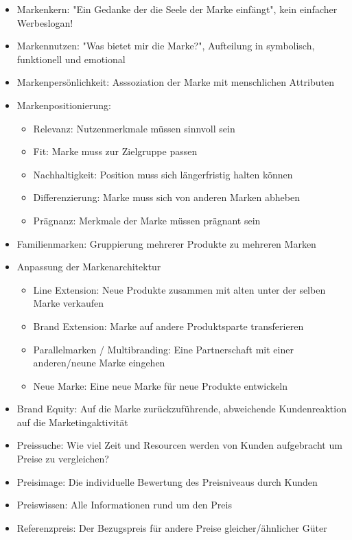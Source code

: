 \documentclass[]{article}
\begin{document}
\begin{itemize}
    \item Markenkern: "Ein Gedanke der die Seele der Marke einfängt", kein einfacher Werbeslogan!
    \item Markennutzen: "Was bietet mir die Marke?", Aufteilung in symbolisch, funktionell und emotional
    \item Markenpersönlichkeit: Asssoziation der Marke mit menschlichen Attributen
    \item Markenpositionierung: 
        \begin{itemize}
            \item Relevanz: Nutzenmerkmale müssen sinnvoll sein
            \item Fit: Marke muss zur Zielgruppe passen
            \item Nachhaltigkeit: Position muss sich längerfristig halten können
            \item Differenzierung: Marke muss sich von anderen Marken abheben
            \item Prägnanz: Merkmale der Marke müssen prägnant sein
        \end{itemize}
    \item Familienmarken: Gruppierung mehrerer Produkte zu mehreren Marken
    \item Anpassung der Markenarchitektur
        \begin{itemize}
            \item Line Extension: Neue Produkte zusammen mit alten unter der selben Marke verkaufen
            \item Brand Extension: Marke auf andere Produktsparte transferieren
            \item Parallelmarken / Multibranding: Eine Partnerschaft mit einer anderen/neune Marke eingehen
            \item Neue Marke: Eine neue Marke für neue Produkte entwickeln
        \end{itemize}
    \item Brand Equity: Auf die Marke zurückzuführende, abweichende Kundenreaktion auf die Marketingaktivität
    \item Preissuche: Wie viel Zeit und Resourcen werden von Kunden aufgebracht um Preise zu vergleichen?
    \item Preisimage: Die individuelle Bewertung des Preisniveaus durch Kunden
    \item Preiswissen: Alle Informationen rund um den Preis
    \item Referenzpreis: Der Bezugspreis für andere Preise gleicher/ähnlicher Güter

\end{itemize}
\end{document}
